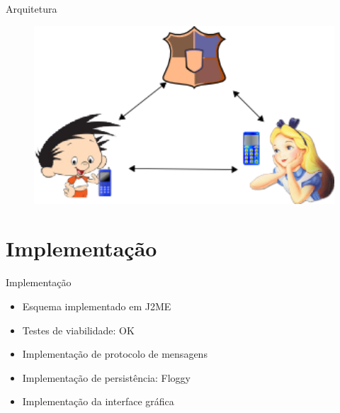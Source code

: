 \documentclass[notes,blue,mathserif]{beamer}
\begin{document}
\begin{frame}{Arquitetura}
\begin{figure}
	\centering
		\includegraphics[width=1.00\textwidth]{figuras/arq.png}
	\label{fig:arq}
\end{figure}


\end{frame}

\section{Implementa\c{c}\~{a}o}

\begin{frame}{Implementa\c{c}\~{a}o}
\begin{itemize}[<+->]
\item Esquema implementado em J2ME
\item Testes de viabilidade: OK
\item Implementa\c{c}\~{a}o de protocolo de mensagens
\item Implementa\c{c}\~{a}o de persist\^{e}ncia: Floggy
\item Implementa\c{c}\~{a}o da interface gr\'{a}fica
\end{itemize}
\end{frame}
\end{document}
